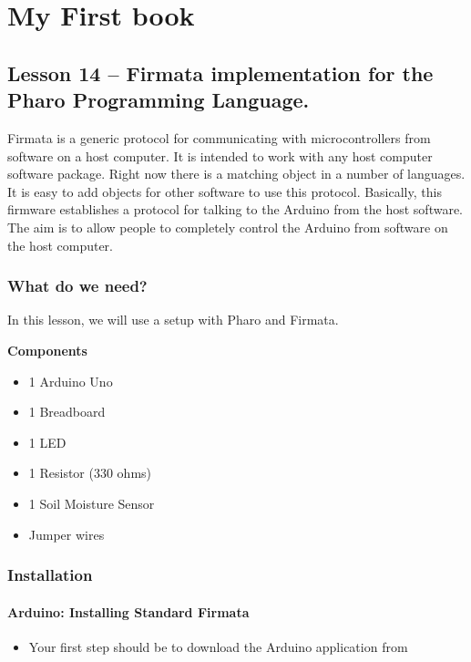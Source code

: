 \documentclass[10pt,twoside,english]{_support/latex/sbabook/sbabook}
\begin{document}
\frontmatter
\pagestyle{plain}

\tableofcontents*
\clearpage\listoffigures

\mainmatter

\part{My First book}\chapter{Lesson 14 –  Firmata implementation for the Pharo Programming Language.}
Firmata is a generic protocol for communicating with microcontrollers from software on a host computer. 
It is intended to work with any host computer software package. Right now there is a matching object in a number of languages. 
It is easy to add objects for other software to use this protocol. 
Basically, this firmware establishes a protocol for talking to the Arduino from the host software. 
The aim is to allow people to completely control the Arduino from software on the host computer.
\section{What do we need?}
In this lesson, we will use a setup with Pharo and Firmata.

\textbf{Components}

\begin{itemize}
\item 1 Arduino Uno
\item 1 Breadboard
\item 1 LED
\item 1 Resistor (330 ohms)
\item 1 Soil Moisture Sensor
\item Jumper wires
\end{itemize}
\section{Installation}\subsection{Arduino: Installing Standard Firmata}
\begin{itemize}
\item Your first step should be to download the Arduino application from 
\end{itemize}
\end{document}
